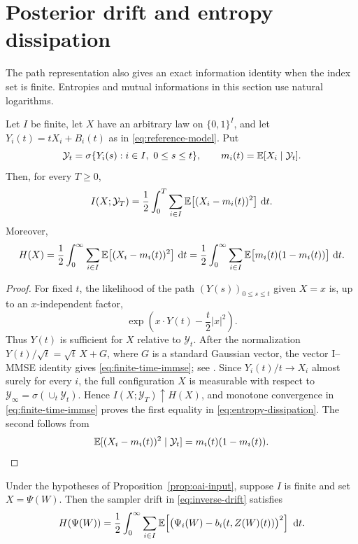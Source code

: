\section{Posterior drift and entropy dissipation}\label{sec:entropy}

The path representation also gives an exact information identity when the
index set is finite.  Entropies and mutual informations in this section use
natural logarithms.

\begin{theorem}\label{thm:entropy-mmse}
Let $I$ be finite, let $X$ have an arbitrary law on $\{0,1\}^I$, and let
$Y_i(t)=tX_i+B_i(t)$ as in \eqref{eq:reference-model}.  Put
\[
 \mathcal Y_t=\sigma\{Y_i(s):i\in I,\ 0\le s\le t\},
 \qquad m_i(t)=\mathbb{E}[X_i\mid\mathcal Y_t].
\]
Then, for every $T\ge0$,
\begin{equation}\label{eq:finite-time-immse}
 I(X;\mathcal Y_T)
 =\frac12\int_0^T\sum_{i\in I}
   \mathbb{E}\bigl[(X_i-m_i(t))^2\bigr]\,\,\mathrm{d} t.
\end{equation}
Moreover,
\begin{equation}\label{eq:entropy-dissipation}
 H(X)
 =\frac12\int_0^\infty\sum_{i\in I}
   \mathbb{E}\bigl[(X_i-m_i(t))^2\bigr]\,\,\mathrm{d} t
 =\frac12\int_0^\infty\sum_{i\in I}
   \mathbb{E}\bigl[m_i(t)(1-m_i(t))\bigr]\,\,\mathrm{d} t.
\end{equation}
\end{theorem}

\begin{proof}
For fixed $t$, the likelihood of the path $(Y(s))_{0\le s\le t}$ given
$X=x$ is, up to an $x$-independent factor,
\[
 \exp\!\left(x\cdot Y(t)-\frac t2|x|^2\right).
\]
Thus $Y(t)$ is sufficient for $X$ relative to $\mathcal Y_t$.  After the
normalization $Y(t)/\sqrt t=\sqrt t\,X+G$, where $G$ is a standard Gaussian
vector, the vector I--MMSE identity gives \eqref{eq:finite-time-immse}; see
\cite{GuoShamaiVerdu2005}.  Since $Y_i(t)/t\to X_i$ almost surely for every
$i$, the full configuration $X$ is measurable with respect to
$\mathcal Y_\infty=\sigma(\cup_t\mathcal Y_t)$.  Hence
$I(X;\mathcal Y_T)\uparrow H(X)$, and monotone convergence in
\eqref{eq:finite-time-immse} proves the first equality in
\eqref{eq:entropy-dissipation}.  The second follows from
\[
 \mathbb{E}[(X_i-m_i(t))^2\mid\mathcal Y_t]=m_i(t)(1-m_i(t)).
\]
\end{proof}

\begin{corollary}\label{cor:sampler-entropy}
Under the hypotheses of Proposition~\ref{prop:oai-input}, suppose $I$ is
finite and set $X=\Psi(W)$.  Then the sampler drift in
\eqref{eq:inverse-drift} satisfies
\begin{equation}\label{eq:sampler-entropy}
 H(\Psi(W))
 =\frac12\int_0^\infty\sum_{i\in I}
 \mathbb{E}\!\left[
   \bigl(\Psi_i(W)-b_i(t,Z(W)(t))\bigr)^2
 \right]\,\,\mathrm{d} t.
\end{equation}
\end{corollary}

